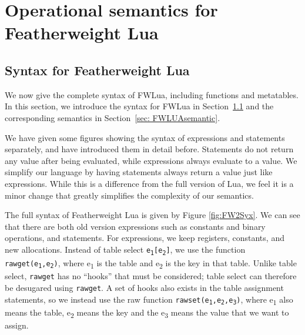 \chapter{Operational semantics for Featherweight Lua} \label{chp: syntax and semantic}

\section{Syntax for Featherweight Lua}\label{sec: FWLUAsyntax}
We now give the complete syntax of FWLua, including functions and metatables. In this section, we introduce the syntax for FWLua in Section~\ref{sec: FWLUAsyntax} and the corresponding semantics in Section~\ref{sec: FWLUAsemantic}.

We have given some figures showing the syntax of expressions and statements separately, and have introduced them in detail before.
Statements do not return any value after being evaluated, while expressions always evaluate to a value.
We simplify our language by
having statements always return a value just like expressions.
While this is a difference from the full version of Lua,
we feel it is a minor change that greatly simplifies the complexity
of our semantics.

The full syntax of Featherweight Lua is given by Figure \ref{fig:FW2Syx}. We can see that there are both old version expressions such as constants and binary operations, and statements. For expressions, we keep registers, constants, and new allocations.
Instead of table select {\tt e\textsubscript{1}[e\textsubscript{2}]}, we use the function {\tt rawget(e\textsubscript{1},e\textsubscript{2})}, where e\textsubscript{1} is the table and e\textsubscript{2} is the key in that table.
Unlike table select, {\tt rawget} has no ``hooks'' that must be considered; table select can therefore be desugared using {\tt rawget}.
A set of hooks also exists in the table assignment statements, so we instead use the raw function {\tt rawset(e\textsubscript{1},e\textsubscript{2},e\textsubscript{3})}, where e\textsubscript{1} also means the table, e\textsubscript{2} means the key and the e\textsubscript{3} means the value that we want to assign.


